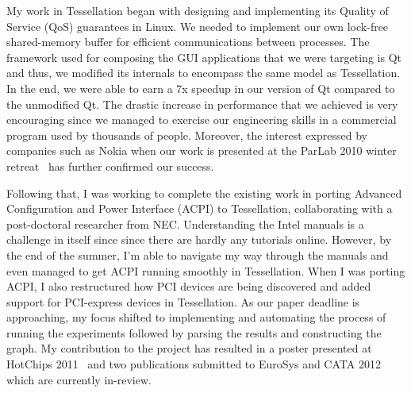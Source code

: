 \documentclass[12pt]{article}
\begin{document}
My work in Tessellation began with designing and implementing its Quality of Service (QoS) guarantees in Linux. We needed to implement our own lock-free shared-memory buffer for efficient communications between processes. The framework used for composing the GUI applications that we were targeting is Qt and thus, we modified its internals to encompass the same model as Tessellation. In the end, we were able to earn a 7x speedup in our version of Qt compared to the unmodified Qt. The drastic increase in performance that we achieved is very encouraging since we managed to exercise our engineering skills in a commercial program used by thousands of people. Moreover, the interest expressed by companies such as Nokia when our work is presented at the ParLab 2010 winter retreat~\cite{tess_retreat2010} has further confirmed our success. \newline

Following that, I was working to complete the existing work in porting Advanced Configuration and Power Interface (ACPI) to Tessellation, collaborating with a post-doctoral researcher from NEC. Understanding the Intel manuals is a challenge in itself since since there are hardly any tutorials online. However, by the end of the summer, I'm able to navigate my way through the manuals and even managed to get ACPI running smoothly in Tessellation. When I was porting ACPI, I also restructured how PCI devices are being discovered and added support for PCI-express devices in Tessellation. As our paper deadline is approaching, my focus shifted to implementing and automating the process of running the experiments followed by parsing the results and constructing the graph. My contribution to the project has resulted in a poster presented at HotChips 2011~\cite{tess_hotchip} and two publications submitted to EuroSys and CATA 2012~\cite{tess_eurosys, tess_cata} which are currently in-review. \newline
\end{document}
